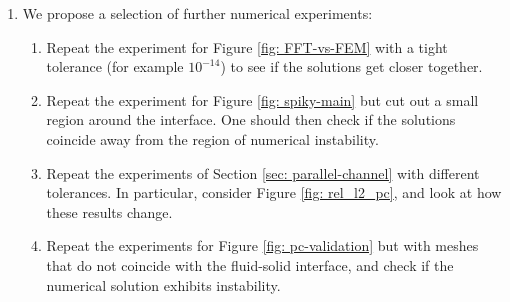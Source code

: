 \documentclass[12pt]{article}
\theoremstyle{theorem}
\begin{document}
\begin{enumerate}
    \item We propose a selection of further numerical experiments:
    \begin{enumerate}
        \item Repeat the experiment for Figure \ref{fig: FFT-vs-FEM} with a tight tolerance (for example $10^{-14}$) to see if the solutions get closer together.
        \item Repeat the experiment for Figure \ref{fig: spiky-main} but cut out a small region around the interface. One should then check if the solutions coincide away from the region of numerical instability.
        \item Repeat the experiments of Section \ref{sec: parallel-channel} with different tolerances. In particular, consider Figure \ref{fig: rel_l2_pc}, and look at how these results change.
        \item Repeat the experiments for Figure \ref{fig: pc-validation} but with meshes that do not coincide with the fluid-solid interface, and check if the numerical solution exhibits instability.
    \end{enumerate}


\end{enumerate}
\end{document}
